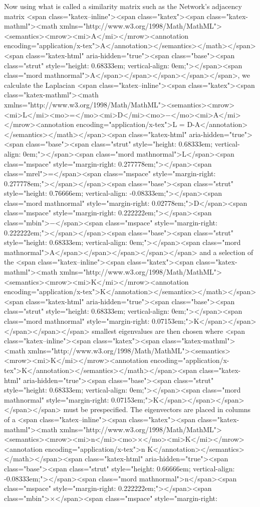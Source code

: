 Now using what is called a similarity matrix such as the Network’s adjacency matrix <span class="katex--inline"><span class="katex"><span class="katex-mathml"><math xmlns="http://www.w3.org/1998/Math/MathML"><semantics><mrow><mi>A</mi></mrow><annotation encoding="application/x-tex">A</annotation></semantics></math></span><span class="katex-html" aria-hidden="true"><span class="base"><span class="strut" style="height: 0.68333em; vertical-align: 0em;"></span><span class="mord mathnormal">A</span></span></span></span></span>, we calculate the Laplacian <span class="katex--inline"><span class="katex"><span class="katex-mathml"><math xmlns="http://www.w3.org/1998/Math/MathML"><semantics><mrow><mi>L</mi><mo>=</mo><mi>D</mi><mo>−</mo><mi>A</mi></mrow><annotation encoding="application/x-tex">L = D-A</annotation></semantics></math></span><span class="katex-html" aria-hidden="true"><span class="base"><span class="strut" style="height: 0.68333em; vertical-align: 0em;"></span><span class="mord mathnormal">L</span><span class="mspace" style="margin-right: 0.277778em;"></span><span class="mrel">=</span><span class="mspace" style="margin-right: 0.277778em;"></span></span><span class="base"><span class="strut" style="height: 0.76666em; vertical-align: -0.08333em;"></span><span class="mord mathnormal" style="margin-right: 0.02778em;">D</span><span class="mspace" style="margin-right: 0.222222em;"></span><span class="mbin">−</span><span class="mspace" style="margin-right: 0.222222em;"></span></span><span class="base"><span class="strut" style="height: 0.68333em; vertical-align: 0em;"></span><span class="mord mathnormal">A</span></span></span></span></span> and a selection of the <span class="katex--inline"><span class="katex"><span class="katex-mathml"><math xmlns="http://www.w3.org/1998/Math/MathML"><semantics><mrow><mi>K</mi></mrow><annotation encoding="application/x-tex">K</annotation></semantics></math></span><span class="katex-html" aria-hidden="true"><span class="base"><span class="strut" style="height: 0.68333em; vertical-align: 0em;"></span><span class="mord mathnormal" style="margin-right: 0.07153em;">K</span></span></span></span></span> smallest eigenvalues are then chosen where <span class="katex--inline"><span class="katex"><span class="katex-mathml"><math xmlns="http://www.w3.org/1998/Math/MathML"><semantics><mrow><mi>K</mi></mrow><annotation encoding="application/x-tex">K</annotation></semantics></math></span><span class="katex-html" aria-hidden="true"><span class="base"><span class="strut" style="height: 0.68333em; vertical-align: 0em;"></span><span class="mord mathnormal" style="margin-right: 0.07153em;">K</span></span></span></span></span> must be prespecified. The eigenvectors are placed in columns of a <span class="katex--inline"><span class="katex"><span class="katex-mathml"><math xmlns="http://www.w3.org/1998/Math/MathML"><semantics><mrow><mi>n</mi><mo>×</mo><mi>K</mi></mrow><annotation encoding="application/x-tex">n \times K</annotation></semantics></math></span><span class="katex-html" aria-hidden="true"><span class="base"><span class="strut" style="height: 0.66666em; vertical-align: -0.08333em;"></span><span class="mord mathnormal">n</span><span class="mspace" style="margin-right: 0.222222em;"></span><span class="mbin">×</span><span class="mspace" style="margin-right: 